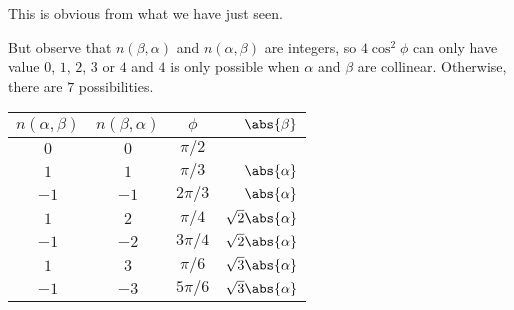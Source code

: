 This is obvious from what we have just seen.

But observe that $n(\beta, \alpha)$ and $n(\alpha, \beta)$ are integers, so
$4\cos^2\phi$ can only have value $0$, $1$, $2$, $3$ or $4$ and
$4$ is only possible when $\alpha$ and $\beta$ are collinear. Otherwise,
there are $7$ possibilities.

\begin{table}[h]
	\centering
\begin{tabular}{@{}cccr@{}} \toprule
	$n(\alpha, \beta)$ & $n(\beta, \alpha)$ &  $\phi$ & $\abs{\beta}$\\ \midrule
	$0$ & $0$ & $\pi/2$\\
	$1$ & $1$ & $\pi/3$ &  $\abs{\alpha}$ \\
	$-1$ & $-1$ & $2\pi/3$ & $\abs{\alpha}$ \\
	$1$ & $2$ & $\pi/4$ & $\sqrt{2}\abs{\alpha}$ \\
	$-1$ & $-2$ & $3\pi/4$ & $\sqrt{2}\abs{\alpha}$\\
	 $1$ & $3$ & $\pi/6$ & $\sqrt{3}\abs{\alpha}$ \\
	 $-1$ & $-3$ & $5\pi/6$ & $\sqrt{3}\abs{\alpha}$\\ \bottomrule
\end{tabular}
\end{table}
